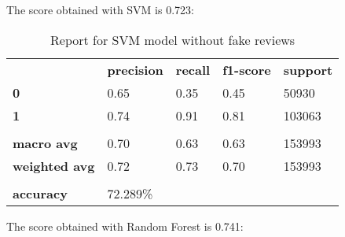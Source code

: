The score obtained with SVM is 0.723:

\begin{table}[h!]
    \centering
    \begin{tabular}{lllll}
        \rowcolor[HTML]{EEEEEE} 
        \cellcolor[HTML]{FBFBFB} & \textbf{precision} & \textbf{recall} & \textbf{f1-score} & \textbf{support} \\
        \rowcolor[HTML]{EEEEEE} 
        \textbf{0}               & 0.65               & 0.35            & 0.45              & 50930            \\
        \rowcolor[HTML]{EEEEEE} 
        \textbf{1}               & 0.74               & 0.91            & 0.81              & 103063           \\
        \rowcolor[HTML]{FBFBFB} 
        &                    &                 &                   &                  \\
        \rowcolor[HTML]{EEEEEE} 
        \textbf{macro avg}       & 0.70               & 0.63            & 0.63              & 153993           \\
        \rowcolor[HTML]{EEEEEE} 
        \textbf{weighted avg}    & 0.72               & 0.73            & 0.70              & 153993           \\
        \rowcolor[HTML]{FBFBFB} 
        &                    &                 &                   &                  \\
        \rowcolor[HTML]{EEEEEE} 
        \textbf{accuracy}        & \multicolumn{4}{l}{\cellcolor[HTML]{EEEEEE}72.289\%}                         
    \end{tabular}
    \caption{Report for SVM model without fake reviews}
    \label{tab:svm-res-no-fake}
\end{table}

The score obtained with Random Forest is 0.741:

